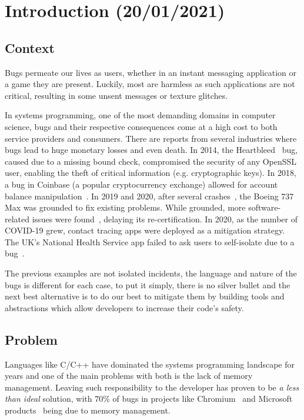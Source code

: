 \chapter{Introduction (20/01/2021)}\label{cha:introduction}

\section{Context}\label{sec:context}


Bugs permeate our lives as users, whether in an instant messaging application or a game they are present.
Luckily, most are harmless as such applications are not critical,
resulting in some unsent messages or texture glitches.

In systems programming, one of the most demanding domains in computer science,
bugs and their respective consequences come at a high cost to both service providers and consumers.
There are reports from several industries where bugs lead to huge monetary losses and even death.
In 2014, the Heartbleed~\autocite{Heartbleed} bug, caused due to a missing bound check,
compromised the security of any OpenSSL user, enabling the theft of critical information (e.g. cryptographic keys).
In 2018, a bug in Coinbase (a popular cryptocurrency exchange)
allowed for account balance manipulation~\autocite{Vicompany2018}.
In 2019 and 2020, after several crashes~\autocite{Campbell2019},
the Boeing 737 Max was grounded to fix existing problems.
While grounded, more software-related issues were found~\autocite{Okane2019,Okane2020}, delaying its re-certification.
In 2020, as the number of COVID-19 grew,
contact tracing apps were deployed as a mitigation strategy.
The UK's National Health Service app failed to ask users to self-isolate due to a
bug~\autocite{Mageit2020}.

The previous examples are not isolated incidents, the language and nature of the bugs is different for each case,
to put it simply, there is no silver bullet and the next best alternative is to do our best to mitigate them by
building tools and abstractions which allow developers to increase their code's safety.

\section{Problem}\label{sec:problem}

Languages like C/C++ have dominated the systems programming landscape for years and
one of the main problems with both is the lack of memory management.
Leaving such responsibility to the developer has proven to be \emph{a less than ideal}
solution, with $70\%$ of bugs in projects like Chromium~\autocite{chromium}
and Microsoft products~\autocite{Miller2019} being due to memory management.

